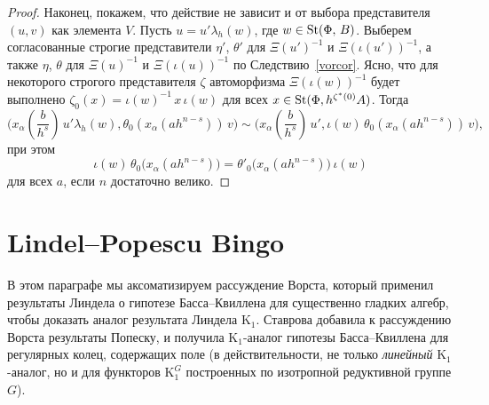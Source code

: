 \documentclass[12pt,a4paper]{article}
\begin{document}
\begin{proof}
Наконец, покажем, что действие не зависит и от выбора представителя $(u, v)$ как элемента $V$. Пусть $u = u' \lambda_h(w)$, где $w \in \mathop{\mathrm{St}}\nolimits(\Phi,\,B)$. Выберем согласованные строгие представители $\eta'$, $\theta'$ для $\Xi(u')^{-1}$ и $\Xi(\iota(u'))^{-1}$, а также $\eta$, $\theta$ для $\Xi(u)^{-1}$ и $\Xi(\iota(u))^{-1}$ по Следствию~\ref{vorcor}. Ясно, что для некоторого строгого представителя $\zeta$ автоморфизма $\Xi(\iota(w))^{-1}$ будет выполнено $\zeta_0(x) = \iota(w)^{-1}\, x\, \iota(w)$ для всех $x \in \mathop{\mathrm{St}}\nolimits(\Phi, h^{\zeta^*(0)} A)$.
Тогда
$$\textstyle
\bigl(x_\alpha(\frac b {h^s})\, u' \lambda_h(w), \theta_0(x_\alpha(ah^{n - s}))\, v\bigr) \sim \bigl(x_\alpha(\frac b {h^s})\, u', \iota(w)\, \theta_0(x_\alpha(ah^{n - s}))\, v\bigr),
$$
при этом
$$
\iota(w)\, \theta_0\big(x_\alpha(ah^{n-s})\big) = \theta'_0\big(x_\alpha(ah^{n-s})\big)\, \iota(w)
$$
для всех \(a\), если \(n\) достаточно велико.
\end{proof}










\section{Lindel--Popescu Bingo}

В этом параграфе мы аксоматизируем рассуждение Ворста, который применил результаты Линдела о гипотезе Басса--Квиллена для существенно гладких алгебр, чтобы доказать аналог результата Линдела $\mathrm K_1$. Ставрова добавила к рассуждению Ворста результаты Попеску, и получила $\mathrm K_1$-аналог гипотезы Басса--Квиллена для регулярных колец, содержащих поле (в действительности, не только {\it линейный} $\mathrm K_1$-аналог, но и для функторов $\mathrm K_1^G$ построенных по изотропной редуктивной группе $G$).
\end{document}
